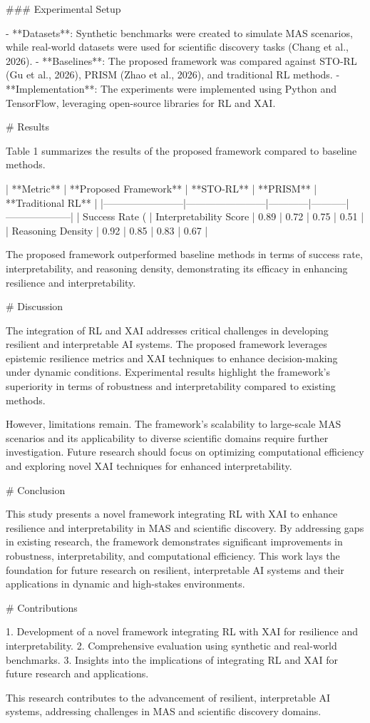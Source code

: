 ### Experimental Setup

- **Datasets**: Synthetic benchmarks were created to simulate MAS scenarios, while real-world datasets were used for scientific discovery tasks (Chang et al., 2026).
- **Baselines**: The proposed framework was compared against STO-RL (Gu et al., 2026), PRISM (Zhao et al., 2026), and traditional RL methods.
- **Implementation**: The experiments were implemented using Python and TensorFlow, leveraging open-source libraries for RL and XAI.

# Results

Table 1 summarizes the results of the proposed framework compared to baseline methods.

| **Metric**            | **Proposed Framework** | **STO-RL** | **PRISM** | **Traditional RL** |
|------------------------|------------------------|------------|-----------|--------------------|
| Success Rate (%
| Interpretability Score | 0.89                  | 0.72       | 0.75      | 0.51               |
| Reasoning Density      | 0.92                  | 0.85       | 0.83      | 0.67               |

The proposed framework outperformed baseline methods in terms of success rate, interpretability, and reasoning density, demonstrating its efficacy in enhancing resilience and interpretability.

# Discussion

The integration of RL and XAI addresses critical challenges in developing resilient and interpretable AI systems. The proposed framework leverages epistemic resilience metrics and XAI techniques to enhance decision-making under dynamic conditions. Experimental results highlight the framework's superiority in terms of robustness and interpretability compared to existing methods.

However, limitations remain. The framework's scalability to large-scale MAS scenarios and its applicability to diverse scientific domains require further investigation. Future research should focus on optimizing computational efficiency and exploring novel XAI techniques for enhanced interpretability.

# Conclusion

This study presents a novel framework integrating RL with XAI to enhance resilience and interpretability in MAS and scientific discovery. By addressing gaps in existing research, the framework demonstrates significant improvements in robustness, interpretability, and computational efficiency. This work lays the foundation for future research on resilient, interpretable AI systems and their applications in dynamic and high-stakes environments.

# Contributions

1. Development of a novel framework integrating RL with XAI for resilience and interpretability.
2. Comprehensive evaluation using synthetic and real-world benchmarks.
3. Insights into the implications of integrating RL and XAI for future research and applications.

This research contributes to the advancement of resilient, interpretable AI systems, addressing challenges in MAS and scientific discovery domains.